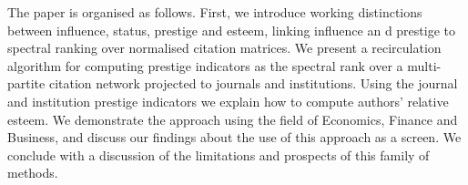 \documentclass[10pt]{article}
\begin{document}
The paper is organised as follows. First, we introduce working distinctions between influence, status, prestige and esteem, linking influence an%
%
d prestige to spectral ranking over normalised citation matrices. We present a recirculation algorithm for computing prestige indicators as the spectral rank over a multi-partite citation network projected to journals and institutions. Using the journal and institution prestige indicators we explain how to compute authors' relative esteem. We demonstrate the approach using the field of Economics, Finance and Business, and discuss our findings about the use of this approach as a screen. We conclude with a discussion of the limitations and prospects of this family of methods. 
\end{document}
